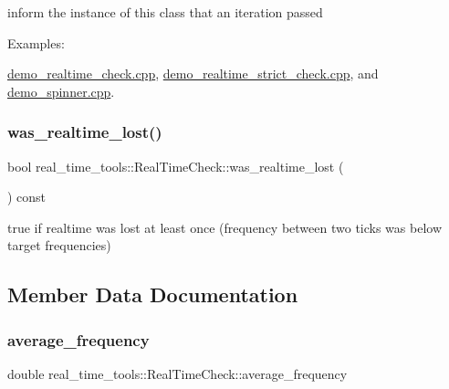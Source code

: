 inform the instance of this class that an iteration passed \begin{Desc}
\item[Examples\+: ]\par
\hyperlink{demo_realtime_check_8cpp-example}{demo\+\_\+realtime\+\_\+check.\+cpp}, \hyperlink{demo_realtime_strict_check_8cpp-example}{demo\+\_\+realtime\+\_\+strict\+\_\+check.\+cpp}, and \hyperlink{demo_spinner_8cpp-example}{demo\+\_\+spinner.\+cpp}.\end{Desc}
\mbox{\label{classreal__time__tools_1_1RealTimeCheck_a88f45e9151a5709812adddbb5dd142cc}} 
\subsubsection{\texorpdfstring{was\+\_\+realtime\+\_\+lost()}{was\_realtime\_lost()}}
{\footnotesize\ttfamily bool real\+\_\+time\+\_\+tools\+::\+Real\+Time\+Check\+::was\+\_\+realtime\+\_\+lost (\begin{DoxyParamCaption}{ }\end{DoxyParamCaption}) const}

true if realtime was lost at least once (frequency between two ticks was below target frequencies) 

\subsection{Member Data Documentation}
\mbox{\label{classreal__time__tools_1_1RealTimeCheck_a3ffb6de7e7c01a7248c2293e29b98011}} 
\subsubsection{\texorpdfstring{average\+\_\+frequency}{average\_frequency}}
{\footnotesize\ttfamily double real\+\_\+time\+\_\+tools\+::\+Real\+Time\+Check\+::average\+\_\+frequency\hspace{0.3cm}{\ttfamily [private]}}

